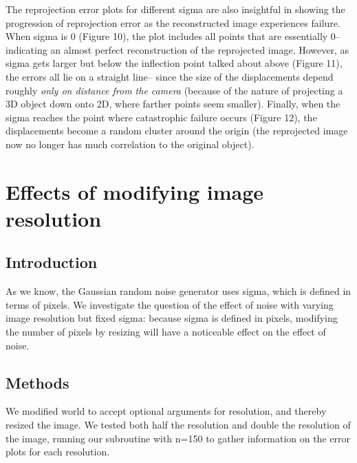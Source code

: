 \documentclass{article}
\begin{document}

The reprojection error plots for different sigma are also insightful in showing the progression of reprojection error as the reconstructed image experiences failure. When sigma is 0 (Figure 10), the plot includes all points that are essentially 0-- indicating an almost perfect reconstruction of the reprojected image. However, as sigma gets larger but below the inflection point talked about above (Figure 11), the errors all lie on a straight line-- since the size of the displacements depend roughly \textit{only on distance from the camera} (because of the nature of projecting a 3D object down onto 2D, where farther points seem smaller). Finally, when the sigma reaches the point where catastrophic failure occurs (Figure 12), the displacements become a random cluster around the origin (the reprojected image now no longer has much correlation to the original object). %









\section{Effects of modifying image resolution}

\subsection{Introduction}

As we know, the Gaussian random noise generator uses sigma, which is defined in terms of pixels. We investigate the question of the effect of noise with varying image resolution but fixed sigma: because sigma is defined in pixels, modifying the number of pixels by resizing will have a noticeable effect on the effect of noise.

\subsection{Methods}

We modified world to accept optional arguments for resolution, and thereby resized the image. We tested both half the resolution and double the resolution of the image, running our subroutine with n=150 to gather information on the error plots for each resolution.
\end{document}
